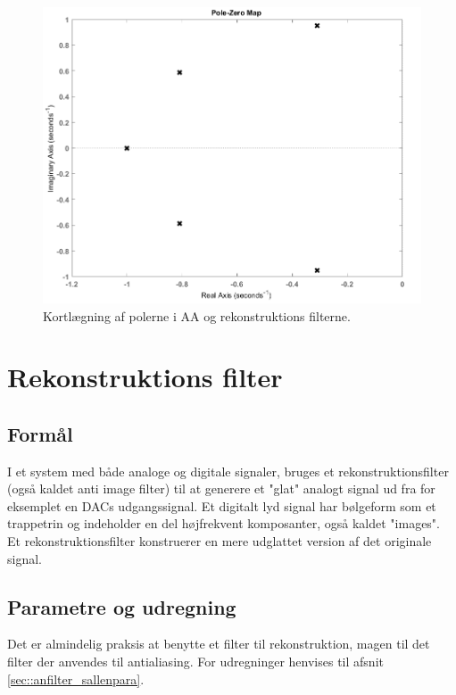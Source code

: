 \begin{figure}[h!]
	\centering
	\includegraphics[scale = 0.4]{./billeder/pzmap}
	\caption{Kortlægning af polerne i AA og rekonstruktions filterne.}
	\label{fig::anfilter_pol}
\end{figure}
\FloatBlock
\section{Rekonstruktions filter}
\subsection{Formål}
I et system med både analoge og digitale signaler, bruges et rekonstruktionsfilter (også kaldet anti image filter) til at generere et "glat" analogt signal ud fra for eksemplet en DACs udgangssignal. Et digitalt lyd signal har bølgeform som et trappetrin og indeholder en del højfrekvent komposanter, også kaldet "images". Et rekonstruktionsfilter konstruerer en mere udglattet version af det originale signal.
\subsection{Parametre og udregning}
Det er almindelig praksis at benytte et filter til rekonstruktion, magen til det filter der anvendes til antialiasing. For udregninger henvises til afsnit \ref{sec::anfilter_sallenpara}.

